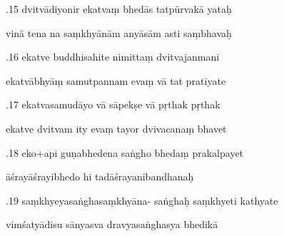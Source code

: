 \documentclass[article,12pt,a4paper]{memoir}%
\newcounter{parCount}
\begin{document}
	  
	  \pstart {}.15 dvitvādiyonir ekatvaṃ bhedās tatpūrvakā yataḥ 
	{}
	\pend%
      

	  
	  \pstart \leavevmode%
	vinā tena na saṃkhyānām anyāsām asti saṃbhavaḥ 
	{}
	\pend%
      

	  
	  \pstart {}.16 ekatve buddhisahite nimittaṃ dvitvajanmani 
	{}
	\pend%
      

	  
	  \pstart \leavevmode%
	ekatvābhyāṃ samutpannam evaṃ vā tat pratīyate 
	{}
	\pend%
      

	  
	  \pstart {}.17 ekatvasamudāyo vā sāpekṣe vā pṛthak pṛthak 
	{}
	\pend%
      

	  
	  \pstart \leavevmode%
	ekatve dvitvam ity evaṃ tayor dvivacanaṃ bhavet 
	{}
	\pend%
      

	  
	  \pstart {}.18 eko+api guṇabhedena saṅgho bhedaṃ prakalpayet 
	{}
	\pend%
      

	  
	  \pstart \leavevmode%
	āśrayāśrayibhedo hi tadāśrayanibandhanaḥ 
	{}
	\pend%
      

	  
	  \pstart {}.19 saṃkhyeyasaṅghasaṃkhyāna- saṅghaḥ saṃkhyeti kathyate 
	{}
	\pend%
      

	  
	  \pstart \leavevmode%
	vimśatyādisu sānyasva dravyasaṅghasya bhedikā 
	{}
	\pend%
      
\end{document}
